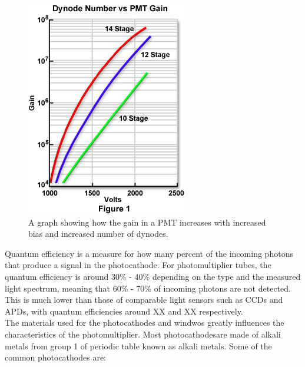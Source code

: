 \begin{figure}[htb]
\begin{center}
\includegraphics[scale=0.6]{figures/RCS/dynodegain}
\caption{A graph showing how the gain in a PMT increases with increased bias and increased number of dynodes.}
\label{fig:dynode_gain}
\end{center}
\end{figure}

Quantum efficiency is a measure for how many percent of the incoming photons that produce a signal in the photocathode. For photomultiplier tubes, the quantum efficiency is around 30\% - 40\% depending on the type and the measured light spectrum, meaning that 60\% - 70\% of incoming photons are not detected. This is much lower than those of comparable light sensors such as CCDs and APDs, with quantum efficiencies around XX and XX respectively.\\


The materials used for the photocathodes and windwos greatly influences the characteristics of the photomultiplier. Most photocathodesare made of alkali metals from group 1 of periodic table known as alkali metals. Some of the common photocathodes are:\\



